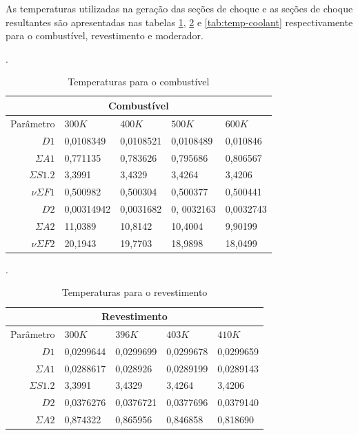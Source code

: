 As temperaturas utilizadas na geração das seções de choque
e as seções de choque resultantes são apresentadas nas tabelas \ref{tab:temp-fuel},
\ref{tab:temp-cladding} e \ref{tab:temp-coolant} respectivamente para o combustível, revestimento
e moderador.


\begin{table}[htb]
  \centering
  \caption[Temperaturas para combustível.]{Temperaturas para o combustível}.
  \label{tab:temp-fuel}
  \begin{tabular}{r l l l l}
  \multicolumn{5}{c}{Combustível} \\
  \hline
  Parâmetro & $300K$ & $400K$ & $500K$ & $600K$ \\
  \hline
  $D1$ & 0,0108349 & 0,0108521 & 0,0108489 & 0,010846\\
  $\Sigma A1$ & 0,771135 & 0,783626 & 0,795686 & 0,806567\\
  $\Sigma S1.2$ & 3,3991 & 3,4329 & 3,4264 & 3,4206\\
  $\nu \Sigma F1$ & 0,500982 & 0,500304 & 0,500377 & 0,500441\\
  \hline
  $D2$ & 0,00314942 & 0,0031682 & 0, 0032163 & 0,0032743 \\
  $\Sigma A2$ & 11,0389 & 10,8142 & 10,4004 & 9,90199\\
  $\nu \Sigma F2$ & 20,1943 & 19,7703 & 18,9898 & 18,0499\\
  \hline
\end{tabular}
\end{table}

\begin{table}[htb]
  \centering
  \caption[Temperaturas para o revestimento.]{Temperaturas para o revestimento}.
  \label{tab:temp-cladding}
  \begin{tabular}{r l l l l}
    \multicolumn{5}{c}{Revestimento} \\
    \hline
    Parâmetro & $300K$ & $396K$ & $403K$ & $410K$ \\
    \hline
    $D1$ & 0,0299644 & 0,0299699 & 0,0299678 & 0,0299659 \\
    $\Sigma A1$ & 0,0288617 & 0,028926 & 0,0289199 & 0,0289143 \\
    $\Sigma S1.2$ & 3,3991 & 3,4329 & 3,4264 & 3,4206\\
    \hline
    $D2$ & 0,0376276 & 0,0376721 & 0,0377696 & 0,0379140\\
    $\Sigma A2$ & 0,874322 & 0,865956 & 0,846858 & 0,818690\\
    \hline
  \end{tabular}
\end{table}


